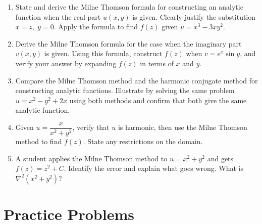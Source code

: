 \documentclass[12pt,a4paper]{article}
\begin{document}
\begin{enumerate}
  \item State and derive the Milne Thomson formula for constructing an analytic function when the real part \( u(x,y) \) is given. Clearly justify the substitution \( x = z,\; y = 0 \). Apply the formula to find \( f(z) \) given \( u = x^3 - 3xy^2 \).

  \item Derive the Milne Thomson formula for the case when the imaginary part \( v(x,y) \) is given. Using this formula, construct \( f(z) \) when \( v = e^x \sin y \), and verify your answer by expanding \( f(z) \) in terms of \( x \) and \( y \).

  \item Compare the Milne Thomson method and the harmonic conjugate method for constructing analytic functions. Illustrate by solving the same problem \( u = x^2 - y^2 + 2x \) using both methods and confirm that both give the same analytic function.

  \item Given \( u = \dfrac{x}{x^2+y^2} \), verify that \( u \) is harmonic, then use the Milne Thomson method to find \( f(z) \). State any restrictions on the domain.

  \item A student applies the Milne Thomson method to \( u = x^2 + y^2 \) and gets \( f(z) = z^2 + C \). Identify the error and explain what goes wrong. What is \( \nabla^2(x^2+y^2) \)?
\end{enumerate}

\section{Practice Problems}
\end{document}
